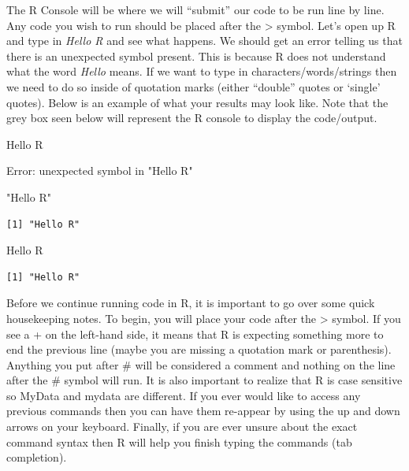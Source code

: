 \documentclass[
  letterpaper,
  DIV=11,
  numbers=noendperiod]{scrreprt}
\newenvironment{Shaded}{\begin{snugshade}}{\end{snugshade}}
\newcommand{\NormalTok}[1]{\textcolor[rgb]{0.00,0.23,0.31}{#1}}
\newcommand{\StringTok}[1]{\textcolor[rgb]{0.13,0.47,0.30}{#1}}
\begin{document}
The R Console will be where we will ``submit'' our code to be run line
by line. Any code you wish to run should be placed after the
\textgreater{} symbol. Let's open up R and type in \emph{Hello R} and
see what happens. We should get an error telling us that there is an
unexpected symbol present. This is because R does not understand what
the word \emph{Hello} means. If we want to type in
characters/words/strings then we need to do so inside of quotation marks
(either ``double'' quotes or `single' quotes). Below is an example of
what your results may look like. Note that the grey box seen below will
represent the R console to display the code/output.

\begin{Shaded}
\begin{Highlighting}[]
\NormalTok{Hello R}
\end{Highlighting}
\end{Shaded}

{Error: unexpected symbol in "Hello R"}

\begin{Shaded}
\begin{Highlighting}[]
\StringTok{"Hello R"}
\end{Highlighting}
\end{Shaded}

\begin{verbatim}
[1] "Hello R"
\end{verbatim}

\begin{Shaded}
\begin{Highlighting}[]
\StringTok{\textquotesingle{}Hello R\textquotesingle{}}
\end{Highlighting}
\end{Shaded}

\begin{verbatim}
[1] "Hello R"
\end{verbatim}

Before we continue running code in R, it is important to go over some
quick housekeeping notes. To begin, you will place your code after the
\textgreater{} symbol. If you see a + on the left-hand side, it means
that R is expecting something more to end the previous line (maybe you
are missing a quotation mark or parenthesis). Anything you put after \#
will be considered a comment and nothing on the line after the \# symbol
will run. It is also important to realize that R is case sensitive so
MyData and mydata are different. If you ever would like to access any
previous commands then you can have them re-appear by using the up and
down arrows on your keyboard. Finally, if you are ever unsure about the
exact command syntax then R will help you finish typing the commands
(tab completion).
\end{document}
